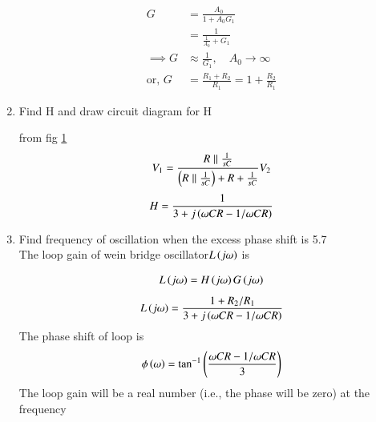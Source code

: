 \begin{enumerate}[label=\arabic*.,ref=\theenumi]
\begin{align}
G &= \frac{A_{0}}{1+A_{0}G_{1}}
\\
&= \frac{1}{\frac{1}{A_{0}} + G_{1}}
\\
\implies G&\approx \frac{1}{G_{1}}, \quad   A_{0}\to\infty
\\
\text{or, } G &= \frac{R_{1}+R_{2}}{R_{1}}=1+\frac{R_{2}}{R_{1}}
\label{eq:ee18btech11047_G}
\end{align}


\item  Find H and draw circuit diagram for H
\\
\solution  

\begin{figure}[!ht]
	\begin{center}
		\resizebox{\columnwidth}{!}{}
	\end{center}
\caption{}
\label{fig:ee18btech11049_h_block}
\end{figure}

from fig \ref{fig:ee18btech11049_h_block} 
\begin{align}
    V_1 = \frac{R \parallel \frac{1}{sC}}{\left(R \parallel \frac{1}{sC}\right) + R + \frac{1}{sC}} V_2
\end{align}
\begin{align}
    H = \frac{1}{3+j\left(\omega CR - 1/\omega CR\right)}
\end{align}



\item Find frequency of oscillation when the excess phase shift  is 5.7\degree
\\
\solution  The loop gain of wein bridge oscillator$L\left(j\omega\right)$ is 


\begin{align}
    L\left(j\omega\right) = H\left(j\omega\right)G\left(j\omega\right)
\end{align}
%
\begin{align}
\label{eq:ee18btech11049_wein_main}
    L\brak{j\omega} = \frac{1+ R_2/R_1 }  {3+j\brak{\omega CR - 1/\omega CR}}
\end{align}
%
The phase shift of loop is 
\begin{align}
\label{eq:ee18btech11049_loop_phase}
    \phi\brak{\omega} = \tan^{-1}\brak{\frac{\omega CR - 1/\omega CR}{3}}
\end{align}
%
The loop gain will be a real number
(i.e., the phase will be zero) at the frequency


\end{enumerate}
